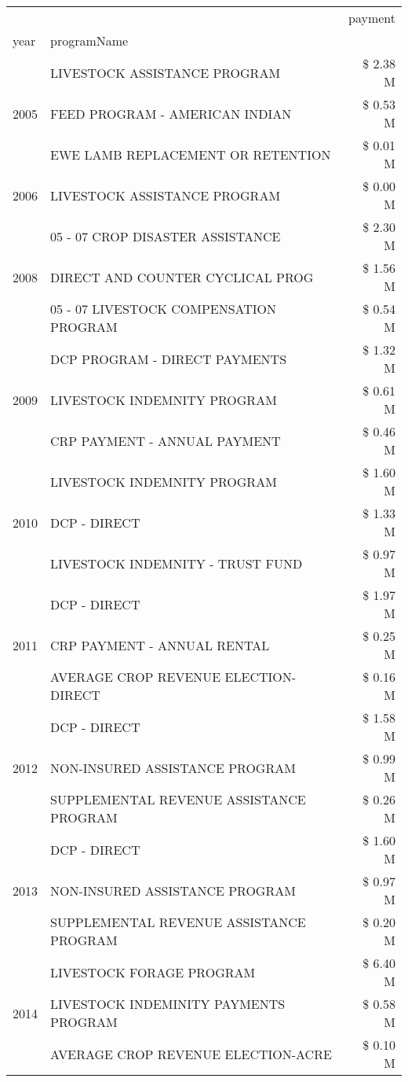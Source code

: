 \begin{tabular}{llr}
\toprule
 &  & payment \\
year & programName &  \\
\midrule
\multirow[t]{3}{*}{2005} & LIVESTOCK ASSISTANCE PROGRAM & \$ 2.38 M \\
 & FEED PROGRAM - AMERICAN INDIAN & \$ 0.53 M \\
 & EWE LAMB REPLACEMENT OR RETENTION & \$ 0.01 M \\
\cline{1-3}
2006 & LIVESTOCK ASSISTANCE PROGRAM & \$ 0.00 M \\
\cline{1-3}
\multirow[t]{3}{*}{2008} & 05 - 07 CROP DISASTER ASSISTANCE & \$ 2.30 M \\
 & DIRECT AND COUNTER CYCLICAL PROG & \$ 1.56 M \\
 & 05 - 07 LIVESTOCK COMPENSATION PROGRAM & \$ 0.54 M \\
\cline{1-3}
\multirow[t]{3}{*}{2009} & DCP PROGRAM - DIRECT PAYMENTS & \$ 1.32 M \\
 & LIVESTOCK INDEMNITY PROGRAM & \$ 0.61 M \\
 & CRP PAYMENT - ANNUAL PAYMENT & \$ 0.46 M \\
\cline{1-3}
\multirow[t]{3}{*}{2010} & LIVESTOCK INDEMNITY PROGRAM & \$ 1.60 M \\
 & DCP - DIRECT & \$ 1.33 M \\
 & LIVESTOCK INDEMNITY - TRUST FUND & \$ 0.97 M \\
\cline{1-3}
\multirow[t]{3}{*}{2011} & DCP - DIRECT & \$ 1.97 M \\
 & CRP PAYMENT - ANNUAL RENTAL & \$ 0.25 M \\
 & AVERAGE CROP REVENUE ELECTION-DIRECT & \$ 0.16 M \\
\cline{1-3}
\multirow[t]{3}{*}{2012} & DCP - DIRECT & \$ 1.58 M \\
 & NON-INSURED ASSISTANCE PROGRAM & \$ 0.99 M \\
 & SUPPLEMENTAL REVENUE ASSISTANCE PROGRAM & \$ 0.26 M \\
\cline{1-3}
\multirow[t]{3}{*}{2013} & DCP - DIRECT & \$ 1.60 M \\
 & NON-INSURED ASSISTANCE PROGRAM & \$ 0.97 M \\
 & SUPPLEMENTAL REVENUE ASSISTANCE PROGRAM & \$ 0.20 M \\
\cline{1-3}
\multirow[t]{3}{*}{2014} & LIVESTOCK FORAGE PROGRAM & \$ 6.40 M \\
 & LIVESTOCK INDEMINITY PAYMENTS PROGRAM & \$ 0.58 M \\
 & AVERAGE CROP REVENUE ELECTION-ACRE & \$ 0.10 M \\

\end{tabular}
